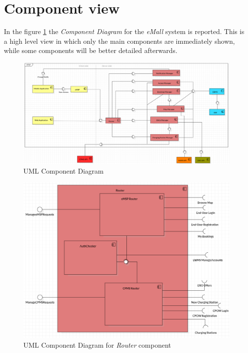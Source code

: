 \documentclass[a4paper]{report}
\begin{document}
\section{Component view}
In the figure \ref{fig:general-component-diagram} the \textit{Component Diagram} for the \textit{eMall} system is reported. This is a high level view in which only the main components are immediately shown, while some components will be better detailed afterwards.

\begin{figure}[hp]
\centering
\includegraphics[scale=0.5 ]{img/GENERAL DIAGRAM_v2.png}
\caption{UML Component Diagram}
\label{fig:general-component-diagram}
\end{figure}


\begin{figure}[hp]
\centering
\includegraphics[scale=0.6]{img/ROUTER.png}
\caption{UML Component Diagram for \textit{Router} component}
\label{fig:router-component}
\end{figure}
\end{document}
